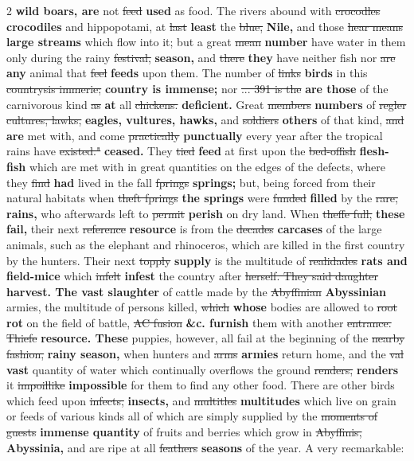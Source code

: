 \documentclass[10pt]{article}
\begin{document}
\begin{multicols}{2}
\textbf{wild boars, are} not \sout{feed} \textbf{used} as food. The rivers abound with \sout{crocodles} \textbf{crocodiles} and hippopotami, at \sout{last} \textbf{least} the \sout{blue,} \textbf{Nile,} and those \sout{hear means} \textbf{large streams} which flow into it; but a great \sout{mean} \textbf{number} have water in them only during the rainy \sout{festival,} \textbf{season,} and \sout{there} \textbf{they} have neither fish nor \sout{are} \textbf{any} animal that \sout{feel} \textbf{feeds} upon them. The number of \sout{links} \textbf{birds} in this \sout{countrysis immerie;} \textbf{country is immense;} nor \sout{... 391 is the} \textbf{are those} of the carnivorous kind \sout{as} \textbf{at} all \sout{chickens.} \textbf{deficient.} Great \sout{members} \textbf{numbers} of \sout{regler cultures, lawks,} \textbf{eagles, vultures, hawks,} and \sout{soldiers} \textbf{others} of that kind, \sout{and} \textbf{are} met with, and come \sout{practically} \textbf{punctually} every year after the tropical rains have \sout{existed."} \textbf{ceased.} They \sout{tied} \textbf{feed} at first upon the \sout{bed-offish} \textbf{flesh-fish} which are met with in great quantities on the edges of the defects, where they \sout{find} \textbf{had} lived in the fall \sout{fprings} \textbf{springs;} but, being forced from their natural habitats when \sout{theft fprings} \textbf{the springs} were \sout{funded} \textbf{filled} by the \sout{rare,} \textbf{rains,} who afterwards left to \sout{permit} \textbf{perish} on dry land. When \sout{theffe full,} \textbf{these fail,} their next \sout{reference} \textbf{resource} is from the \sout{decades} \textbf{carcases} of the large animals, such as the elephant and rhinoceros, which are killed in the first country by the hunters. Their next \sout{topply} \textbf{supply} is the multitude of \sout{realidades} \textbf{rats and field-mice} which \sout{infelt} \textbf{infest} the country after \sout{herself. They said daughter} \textbf{harvest. The vast slaughter} of cattle made by the \sout{Abyffinian} \textbf{Abyssinian} armies, the multitude of persons killed, \sout{which} \textbf{whose} bodies are allowed to \sout{root} \textbf{rot} on the field of battle, \sout{AC fusion} \textbf{\&c. furnish} them with another \sout{entrance. Thiefe} \textbf{resource. These} puppies, however, all fail at the beginning of the \sout{nearby fashion,} \textbf{rainy season,} when hunters and \sout{arms} \textbf{armies} return home, and the \sout{val} \textbf{vast} quantity of water which continually overflows the ground \sout{renders,} \textbf{renders} it \sout{impoillike} \textbf{impossible} for them to find any other food. There are other birds which feed upon \sout{infects,} \textbf{insects,} and \sout{multitles} \textbf{multitudes} which live on grain or feeds of various kinds all of which are simply supplied by the \sout{moments of guests} \textbf{immense quantity} of fruits and berries which grow in \sout{Abyffinis,} \textbf{Abyssinia,} and are ripe at all \sout{feathers} \textbf{seasons} of the year. A very recmarkable:
\end{multicols}
\end{document}
